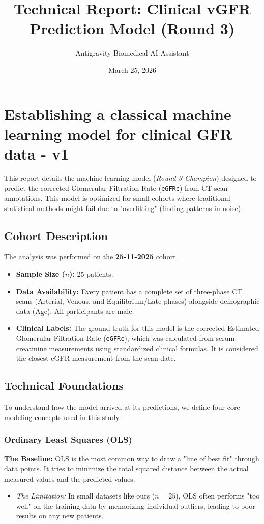 \documentclass[11pt,a4paper]{article}
\title{Technical Report: Clinical vGFR Prediction Model (Round 3)}
\author{Antigravity Biomedical AI Assistant}
\date{March 25, 2026}
\begin{document}
\maketitle

\section{Establishing a classical machine learning model for clinical GFR data - v1}


This report details the machine learning model (\textit{Round 3 Champion}) designed to predict the corrected Glomerular Filtration Rate (\texttt{eGFRc}) from CT scan annotations. This model is optimized for small cohorts where traditional statistical methods might fail due to "overfitting" (finding patterns in noise).

\subsection{Cohort Description}
The analysis was performed on the \textbf{25-11-2025} cohort. 
\begin{itemize}
    \item \textbf{Sample Size ($n$):} 25 patients.
    \item \textbf{Data Availability:} Every patient has a complete set of three-phase CT scans (Arterial, Venous, and Equilibrium/Late phases) alongside demographic data (Age). All participants are male.
    \item \textbf{Clinical Labels:} The ground truth for this model is the corrected Estimated Glomerular Filtration Rate (\texttt{eGFRc}), which was calculated from serum creatinine measurements using standardized clinical formulas. It is considered the closest eGFR measurement from the scan date.
\end{itemize}


\subsection{Technical Foundations}
To understand how the model arrived at its predictions, we define four core modeling concepts used in this study.

\subsubsection{Ordinary Least Squares (OLS)}
\textbf{The Baseline:} OLS is the most common way to draw a "line of best fit" through data points. It tries to minimize the total squared distance between the actual measured values and the predicted values. 
\begin{itemize}
    \item \textit{The Limitation:} In small datasets like ours ($n=25$), OLS often performs "too well" on the training data by memorizing individual outliers, leading to poor results on any new patients.
\end{itemize}
\end{document}

